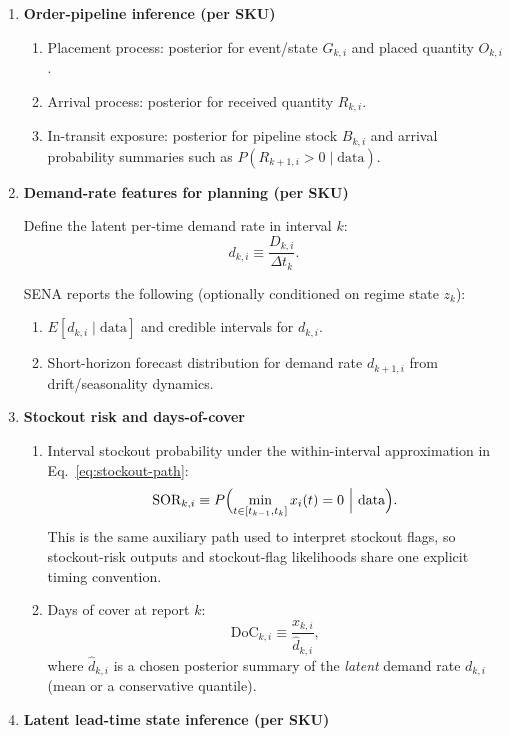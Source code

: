 \documentclass[11pt]{article}
\begin{document}
\begin{enumerate}
  \item \textbf{Order-pipeline inference (per SKU)}
  \begin{enumerate}
    \item Placement process: posterior for event/state $G_{k,i}$ and placed quantity $O_{k,i}$.
    \item Arrival process: posterior for received quantity $R_{k,i}$.
    \item In-transit exposure: posterior for pipeline stock $B_{k,i}$ and arrival probability summaries such as $P(R_{k+1,i}>0\mid\text{data})$.
  \end{enumerate}

  \item \textbf{Demand-rate features for planning (per SKU)}

  Define the latent per-time demand rate in interval $k$:
  \[
    d_{k,i} \equiv \frac{D_{k,i}}{\Delta t_k}.
  \]

  SENA reports the following (optionally conditioned on regime state $z_k$):
  \begin{enumerate}
    \item $E[d_{k,i}\mid\text{data}]$ and credible intervals for $d_{k,i}$.
    \item Short-horizon forecast distribution for demand rate $d_{k+1,i}$ from drift/seasonality dynamics.
  \end{enumerate}

  \item \textbf{Stockout risk and days-of-cover}
  \begin{enumerate}
    \item Interval stockout probability under the within-interval approximation in Eq.~\eqref{eq:stockout-path}:
    \[
      \text{SOR}_{k,i} \equiv P\Bigl(\min_{t\in[t_{k-1},t_k]} x_i(t)=0\ \Big|\ \text{data}\Bigr).
    \]
    This is the same auxiliary path used to interpret stockout flags, so stockout-risk outputs and stockout-flag likelihoods share one explicit timing convention.
    \item Days of cover at report $k$:
    \[
      \text{DoC}_{k,i} \equiv \frac{x_{k,i}}{\hat d_{k,i}},
    \]
    where $\hat d_{k,i}$ is a chosen posterior summary of the \emph{latent} demand rate $d_{k,i}$ (mean or a conservative quantile).
  \end{enumerate}

  \item \textbf{Latent lead-time state inference (per SKU)}


\end{enumerate}
\end{document}
